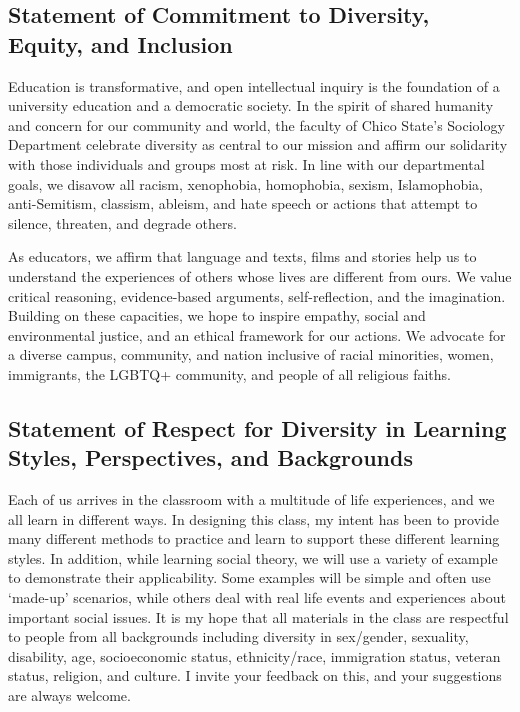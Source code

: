 \documentclass[11pt,]{article}
\begin{document}
\hypertarget{statement-of-commitment-to-diversity-equity-and-inclusion}{%
\subsection{Statement of Commitment to Diversity, Equity, and
Inclusion}\label{statement-of-commitment-to-diversity-equity-and-inclusion}}

Education is transformative, and open intellectual inquiry is the
foundation of a university education and a democratic society. In the
spirit of shared humanity and concern for our community and world, the
faculty of Chico State's Sociology Department celebrate diversity as
central to our mission and affirm our solidarity with those individuals
and groups most at risk. In line with our departmental goals, we disavow
all racism, xenophobia, homophobia, sexism, Islamophobia, anti-Semitism,
classism, ableism, and hate speech or actions that attempt to silence,
threaten, and degrade others.

As educators, we affirm that language and texts, films and stories help
us to understand the experiences of others whose lives are different
from ours. We value critical reasoning, evidence-based arguments,
self-reflection, and the imagination. Building on these capacities, we
hope to inspire empathy, social and environmental justice, and an
ethical framework for our actions. We advocate for a diverse campus,
community, and nation inclusive of racial minorities, women, immigrants,
the LGBTQ+ community, and people of all religious faiths.

\hypertarget{statement-of-respect-for-diversity-in-learning-styles-perspectives-and-backgrounds}{%
\subsection{Statement of Respect for Diversity in Learning Styles,
Perspectives, and
Backgrounds}\label{statement-of-respect-for-diversity-in-learning-styles-perspectives-and-backgrounds}}

Each of us arrives in the classroom with a multitude of life
experiences, and we all learn in different ways. In designing this
class, my intent has been to provide many different methods to practice
and learn to support these different learning styles. In addition, while
learning social theory, we will use a variety of example to demonstrate
their applicability. Some examples will be simple and often use
`made-up' scenarios, while others deal with real life events and
experiences about important social issues. It is my hope that all
materials in the class are respectful to people from all backgrounds
including diversity in sex/gender, sexuality, disability, age,
socioeconomic status, ethnicity/race, immigration status, veteran
status, religion, and culture. I invite your feedback on this, and your
suggestions are always welcome.
\end{document}

